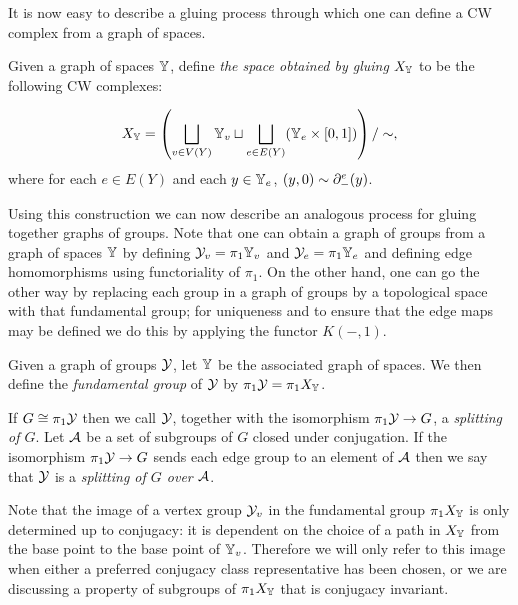 It is now easy to describe a gluing process through which one can define a CW complex from a graph of spaces.

\begin{definition}
  Given a graph of spaces $\mathbb{Y}$, define \emph{the space obtained by gluing} $X_{\mathbb{Y}}$ to be the following CW complexes:

  \begin{align}
    X_{\mathbb{Y}} = \left(\bigsqcup_{v \in V(Y)} \mathbb{Y}_v \sqcup \bigsqcup_{e \in E(Y)} (\mathbb{Y}_e \times [0, 1])\right)/\sim,
  \end{align}
  where for each $e \in E(Y)$ and each $y \in \mathbb{Y}_e$, $(y, 0) \sim \partial^e_{-}(y)$.
\end{definition}

Using this construction we can now describe an analogous process for gluing together graphs of groups.
Note that one can obtain a graph of groups from a graph of spaces $\mathbb{Y}$ by defining $\mathcal{Y}_v = \pi_1\mathbb{Y}_v$ and $\mathcal{Y}_e = \pi_1\mathbb{Y}_e$ and defining edge homomorphisms using functoriality of $\pi_1$.
On the other hand, one can go the other way by replacing each group in a graph of groups by a topological space with that fundamental group; for uniqueness and to ensure that the edge maps may be defined we do this by applying the functor $K({-},1)$.

\begin{definition}
  Given a graph of groups $\mathcal{Y}$, let $\mathbb{Y}$ be the associated graph of spaces.
  We then define the \emph{fundamental group} of $\mathcal{Y}$ by $\pi_1\mathcal{Y} = \pi_1 X_{\mathbb{Y}}$.

  If $G \cong \pi_1\mathcal{Y}$ then we call $\mathcal{Y}$, together with the isomorphism $\pi_1\mathcal{Y} \to G$, a \emph{splitting of $G$}. 
  Let $\mathcal{A}$ be a set of subgroups of $G$ closed under conjugation. 
  If the isomorphism $\pi_1\mathcal{Y} \to G$ sends each edge group to an element of $\mathcal{A}$ then we say that $\mathcal{Y}$ is a \emph{splitting of $G$ over $\mathcal{A}$}.
\end{definition}

\begin{remark}\label{remark:vertex_subgroups}
  Note that the image of a vertex group $\mathcal{Y}_v$ in the fundamental group $\pi_1 X_{\mathbb{Y}}$ is only determined up to conjugacy: it is dependent on the choice of a path in $X_{\mathbb{Y}}$ from the base point to the base point of $\mathbb{Y}_v$.
  Therefore we will only refer to this image when either a preferred conjugacy class representative has been chosen, or we are discussing a property of subgroups of $\pi_1 X_{\mathbb{Y}}$ that is conjugacy invariant.
\end{remark}

